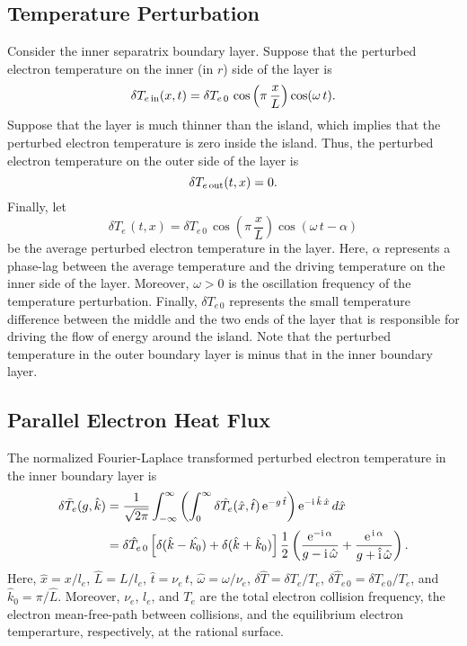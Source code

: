 \documentclass[12pt,prb,aps]{revtex4-1}
\begin{document}
\subsection{Temperature Perturbation}
Consider the inner separatrix boundary layer. Suppose that the perturbed electron temperature on the inner (in $r$) side of the layer is
\begin{equation}
\delta T_{e\,{\rm in}}(x,t) =\delta T_{e\,0}\,\cos\left(\pi\,\frac{x}{L}\right)\cos(\omega \,t).
\end{equation}
Suppose that the layer is much thinner than the island, which implies that the perturbed electron temperature is zero inside the island. Thus, the perturbed electron
temperature on the outer side of the layer is 
\begin{equation}
\delta T_{e\,{\rm out}}(t,x) =0.
\end{equation}
Finally, let 
\begin{equation}
\delta T_{e\,}(t,x) =\delta T_{e\,0}\,\cos\left(\pi\,\frac{x}{L}\right)\cos(\omega \,t-\alpha)
\end{equation}
be the average perturbed electron temperature in the layer. Here, $\alpha$ represents a phase-lag between the average temperature and the driving temperature on the
inner side of the layer. Moreover, $\omega>0$ is the oscillation frequency of the temperature perturbation. Finally, $\delta T_{e\,0}$ represents the small temperature difference 
between the middle  and the two ends of the layer that is responsible for driving the flow of energy around the island. Note that the perturbed temperature in the outer boundary layer is
minus that in the inner boundary layer. 

\subsection{Parallel Electron Heat Flux}
The normalized Fourier-Laplace transformed perturbed electron temperature in the inner boundary layer is
\begin{align}
\delta\bar{T}_e(g,\hat{k}) &= \frac{1}{\sqrt{2\pi}}\int_{-\infty}^\infty \left(\int_0^\infty \delta \hat{T}_e(\hat{x},\hat{t})\,{\rm e}^{-g\,\hat{t}}\right){\rm e}^{-{\rm i}\,\hat{k}\,\hat{x}}\,d\hat{x}
\nonumber\\[0.5ex]
&= \delta\hat{T}_{e\,0}\left[\delta (\hat{k}-\hat{k_0})+ \delta(\hat{k}+\hat{k}_0)\right]\frac{1}{2}\left(
\frac{{\rm e}^{-{\rm i}\,\alpha}}{g-{\rm i}\,\hat{\omega}}+ \frac{{\rm e}^{\,{\rm i}\,\alpha}}{g+\hat{\rm i}\,\hat{\omega}}\right).
\end{align}
Here, $\hat{x}=x/l_e$, $\hat{L}=L/l_e$, $\hat{t}=\nu_e\,t$, $\hat{\omega}=\omega/\nu_e$, $\delta \hat{T} = \delta T_e/T_e$, $\delta \hat{T}_{e\,0} = \delta T_{e\,0}/T_e$, and
$\hat{k}_0=\pi/\hat{L}$. Moreover, $\nu_e$, $l_e$, and $T_e$ are the total electron collision frequency, the electron mean-free-path between collisions, and the equilibrium electron temperarture,
respectively, at the rational surface. 
\end{document}
